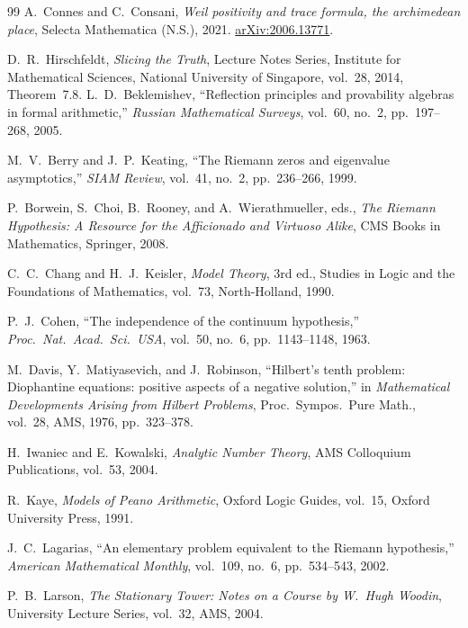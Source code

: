 \documentclass{article}
\theoremstyle{definition}
\begin{document}
\begin{thebibliography}{99}
A.~Connes and C.~Consani, \emph{Weil positivity and trace formula, the
archimedean place}, Selecta Mathematica (N.S.), 2021.
\href{https://arxiv.org/abs/2006.13771}{arXiv:2006.13771}.

D.~R.~Hirschfeldt, \emph{Slicing the Truth}, Lecture Notes Series,
Institute for Mathematical Sciences, National University of Singapore,
vol.~28, 2014, Theorem~7.8.
L.~D.~Beklemishev,
``Reflection principles and provability algebras in formal arithmetic,''
\emph{Russian Mathematical Surveys}, vol.~60, no.~2, pp.~197--268, 2005.

M.~V.~Berry and J.~P.~Keating,
``The Riemann zeros and eigenvalue asymptotics,''
\emph{SIAM Review}, vol.~41, no.~2, pp.~236--266, 1999.

P.~Borwein, S.~Choi, B.~Rooney, and A.~Wierathmueller, eds.,
\emph{The Riemann Hypothesis: A Resource for the Afficionado and Virtuoso Alike},
CMS Books in Mathematics, Springer, 2008.

C.~C.~Chang and H.~J.~Keisler,
\emph{Model Theory}, 3rd ed.,
Studies in Logic and the Foundations of Mathematics, vol.~73,
North-Holland, 1990.

P.~J.~Cohen,
``The independence of the continuum hypothesis,''
\emph{Proc.\ Nat.\ Acad.\ Sci.\ USA}, vol.~50, no.~6,
pp.~1143--1148, 1963.

M.~Davis, Y.~Matiyasevich, and J.~Robinson,
``Hilbert's tenth problem: Diophantine equations: positive aspects
of a negative solution,''
in \emph{Mathematical Developments Arising from Hilbert Problems},
Proc.\ Sympos.\ Pure Math., vol.~28, AMS, 1976, pp.~323--378.

H.~Iwaniec and E.~Kowalski,
\emph{Analytic Number Theory},
AMS Colloquium Publications, vol.~53, 2004.

R.~Kaye,
\emph{Models of Peano Arithmetic},
Oxford Logic Guides, vol.~15, Oxford University Press, 1991.

J.~C.~Lagarias,
``An elementary problem equivalent to the Riemann hypothesis,''
\emph{American Mathematical Monthly}, vol.~109, no.~6, pp.~534--543, 2002.

P.~B.~Larson,
\emph{The Stationary Tower: Notes on a Course by W.~Hugh Woodin},
University Lecture Series, vol.~32, AMS, 2004.


\end{thebibliography}
\end{document}
